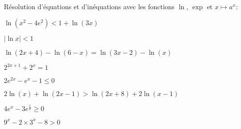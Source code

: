 
\begin{exercice}\;
R\'esolution d'\'equations et d'in\'equations avec les fonctions $\ln{}$, $\exp{}$ et $x\mapsto a^x$:
\begin{enumerate}
\begin{minipage}[t]{0.45\textwidth}
\item  $\ln{(x^2-4e^2)}<1+\ln{(3x)}$
\item $|\ln{x}|<1$
\item  $\ln{(2x+4)} -\ln{(6-x)}=\ln{(3x-2)}-\ln{(x)}  $
\item $2^{2x+1}+2^x=1$
\end{minipage}
\begin{minipage}[t]{0.45\textwidth}
\item  $2e^{2x}-e^x-1\leq 0$
\item  $2\ln{(x)}+\ln{(2x-1)}>\ln{(2x+8)}+2\ln{(x-1)}$
\item  $4e^x-3e^{\frac{x}{2}}\geq 0$
\item $9^x-2\times 3^x-8>0$
\end{minipage}
\end{enumerate}
\end{exercice}